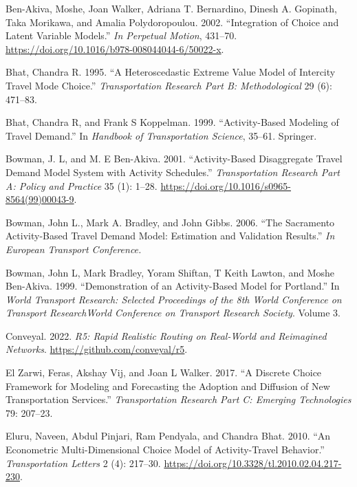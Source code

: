 \documentclass[12pt, oneside, openright]{byuthesis}
\newlength{\cslhangindent}
\newlength{\cslentryspacingunit} %
\newenvironment{CSLReferences}[2] %
 {%
  \setlength{\parindent}{0pt}
  \ifodd #1
  \let\oldpar\par
  \def\par{\hangindent=\cslhangindent\oldpar}
  \fi
  \setlength{\parskip}{#2\cslentryspacingunit}
 }%
 {}
\begin{document}
\begin{CSLReferences}{1}{0}
\leavevmode{}%
Ben-Akiva, Moshe, Joan Walker, Adriana T. Bernardino, Dinesh A. Gopinath, Taka Morikawa, and Amalia Polydoropoulou. 2002. {``Integration of Choice and Latent Variable Models.''} \emph{In Perpetual Motion}, 431--70. \url{https://doi.org/10.1016/b978-008044044-6/50022-x}.

\leavevmode{}%
Bhat, Chandra R. 1995. {``A Heteroscedastic Extreme Value Model of Intercity Travel Mode Choice.''} \emph{Transportation Research Part B: Methodological} 29 (6): 471--83.

\leavevmode{}%
Bhat, Chandra R, and Frank S Koppelman. 1999. {``Activity-Based Modeling of Travel Demand.''} In \emph{Handbook of Transportation Science}, 35--61. Springer.

\leavevmode{}%
Bowman, J. L, and M. E Ben-Akiva. 2001. {``Activity-Based Disaggregate Travel Demand Model System with Activity Schedules.''} \emph{Transportation Research Part A: Policy and Practice} 35 (1): 1--28. \url{https://doi.org/10.1016/s0965-8564(99)00043-9}.

\leavevmode{}%
Bowman, John L., Mark A. Bradley, and John Gibbs. 2006. {``The Sacramento Activity-Based Travel Demand Model: Estimation and Validation Results.''} \emph{In European Transport Conference.}

\leavevmode{}%
Bowman, John L, Mark Bradley, Yoram Shiftan, T Keith Lawton, and Moshe Ben-Akiva. 1999. {``Demonstration of an Activity-Based Model for Portland.''} In \emph{World Transport Research: Selected Proceedings of the 8th World Conference on Transport ResearchWorld Conference on Transport Research Society}. Volume 3.

\leavevmode{}%
Conveyal. 2022. \emph{R5: Rapid Realistic Routing on Real-World and Reimagined Networks}. \url{https://github.com/conveyal/r5}.

\leavevmode{}%
El Zarwi, Feras, Akshay Vij, and Joan L Walker. 2017. {``A Discrete Choice Framework for Modeling and Forecasting the Adoption and Diffusion of New Transportation Services.''} \emph{Transportation Research Part C: Emerging Technologies} 79: 207--23.

\leavevmode{}%
Eluru, Naveen, Abdul Pinjari, Ram Pendyala, and Chandra Bhat. 2010. {``An Econometric Multi-Dimensional Choice Model of Activity-Travel Behavior.''} \emph{Transportation Letters} 2 (4): 217--30. \url{https://doi.org/10.3328/tl.2010.02.04.217-230}.


\end{CSLReferences}
\end{document}
